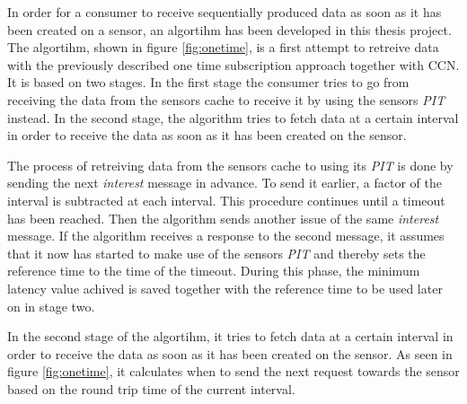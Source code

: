 In order for a consumer to receive sequentially produced data as soon as it has been created on a sensor, an algortihm has been developed in this thesis project. The algortihm, shown in figure \ref{fig:onetime}, is a first attempt to retreive data with the previously described one time subscription approach together with CCN. It is based on two stages. 
In the first stage the consumer tries to go from receiving the data from the sensors cache to receive it by using the sensors \textit{PIT} instead. In the second stage, the algorithm tries to fetch data at a certain interval in order to receive the data as soon as it has been created on the sensor.

The process of retreiving data from the sensors cache to using its \textit{PIT} is done by sending the next \textit{interest} message in advance. To send it earlier, a factor of the interval is subtracted at each interval. This procedure continues until a timeout has been reached. Then the algorithm sends another issue of the same \textit{interest} message. If the algorithm receives a response to the second message, it assumes that it now has started to make use of the sensors \textit{PIT} and thereby sets the reference time to the time of the timeout. During this phase, the minimum latency value achived is saved together with the reference time to be used later on in stage two.

In the second stage of the algortihm, it tries to fetch data at a certain interval in order to receive the data as soon as it has been created on the sensor. As seen in figure \ref{fig:onetime}, it calculates when to send the next request towards the sensor based on the round trip time of the current interval.

